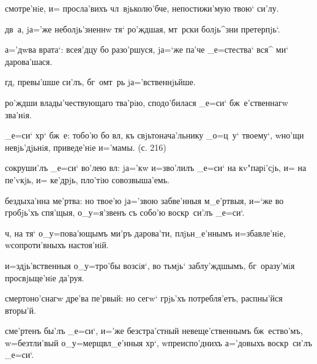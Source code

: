 
смотре'нiе, и= просла'вихъ чл~вjьколю'бче, непостижи'мую 
твою` си'лу.

дв~а, jа='же неболjь'зненнw тя` ро'ждшая, мт~рски 
болjь^зни претерпjь`.

а='дwва врата`: всея'дцу бо разо'ршуся, jа=`же па'че 
_е=стества` вся^ ми` дарова'шася.


гд, превы'шше си'лъ, бг~омт~рь jа='вственнjьйше.

ро'ждши влады'чествующаго тва'рiю, сподо'билася _е=си` 
бж~е'ственнагw зва'нiя.


_е=си` хр` бж~е: тобо'ю бо вл, къ 
свjьтонача'льнику _о=ц~у` твоему`, w\т но'щи 
невjь'дjьнiя, приведе'нiе и='мамы. (с. 216)

сокруши'лъ _е=си` во'лею вл: jа='кw и=зво'лилъ _е=си` 
на кv"парi'сjь, и= на пе'vкjь, и= ке'дрjь, пло'тiю 
совозвыша'емь.

бездыха'нна ме'ртва: но твое'ю jа='звою забве'нныя 
м_е'ртвыя, и=`же во гробjь'хъ спя'щыя, о_у=я'звенъ съ 
собо'ю воскр~си'лъ _е=си`.

ч, на тя` о_у=пова'ющымъ ми'ръ дарова'ти, 
плjьн_е'ннымъ и=збавле'нiе, w\т сопроти'вныхъ настоя'нiй.


и=з\ъ дjь'вственныя о_у=тро'бы возсiя`, во тьмjь` 
заблу'ждшымъ, бг~оразу'мiя просвjьще'нiе да'руя.

смертоно'снагw дре'ва пе'рвый: но сегw` грjь'хъ 
потребля'етъ, распны'йся вторы'й.

сме'ртенъ бы'лъ _е=си`, и='же безстра'стный 
невеще'ственнымъ бж~ество'мъ, w=безтли'вый 
о_у=мерщвл_е'нныя хр`, w\т преиспо'днихъ а='довыхъ 
воскр~си'лъ _е=си`.


